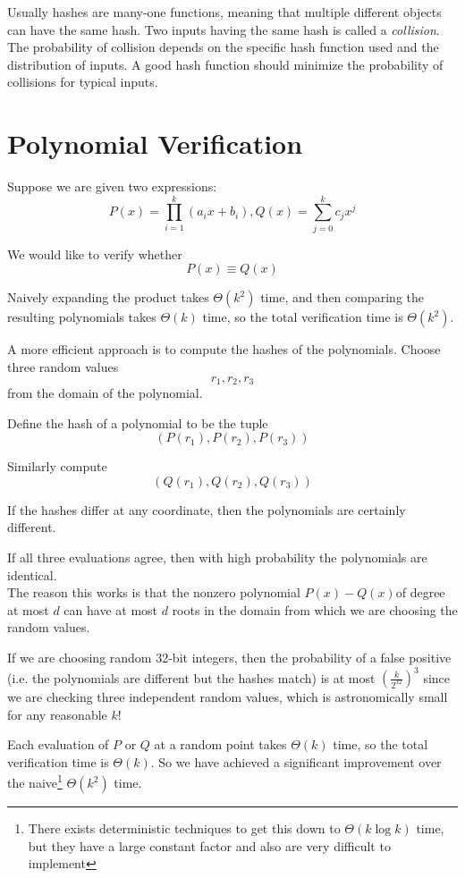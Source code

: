\documentclass[11pt,openany]{book}
\begin{document}
Usually hashes are many-one functions, meaning that multiple different objects can have the same hash. 
Two inputs having the same hash is called a \textit{collision}. The probability of collision depends on 
the specific hash function used and the distribution of inputs. A good hash function should minimize the 
probability of collisions for typical inputs.

\section{Polynomial Verification}

Suppose we are given two expressions:
\[
P(x)=\prod_{i=1}^k (a_i x+b_i), Q(x) = \sum_{j=0}^k c_j x^j
\]

We would like to verify whether
\[
P(x)\equiv Q(x)
\]

Naively expanding the product takes $\Theta(k^2)$ time, and then comparing the resulting 
polynomials takes $\Theta(k)$ time, so the total verification time is $\Theta(k^2)$.

A more efficient approach is to compute the hashes of the polynomials.
Choose three random values
\[
r_1,r_2,r_3
\]
from the domain of the polynomial.

Define the hash of a polynomial to be the tuple
\[
(P(r_1),P(r_2),P(r_3))
\]

Similarly compute
\[
(Q(r_1),Q(r_2),Q(r_3))
\]

If the hashes differ at any coordinate, then the polynomials are certainly different.

If all three evaluations agree, then with high probability the polynomials are identical.\\

The reason this works is that the nonzero polynomial $P(x)-Q(x)$of degree at most $d$ can have at most $d$ roots 
in the domain from which we are choosing the random values.

If we are choosing random 32-bit integers, then the probability of a false positive 
(i.e. the polynomials are different but the hashes match) 
is at most $\left(\frac{k}{2^{32}}\right)^3$ since we are checking three independent random values, 
which is astronomically small for any reasonable $k$!

Each evaluation of $P$ or $Q$ at a random point takes $\Theta(k)$ time, so 
the total verification time is $\Theta(k)$. So we have achieved a significant improvement over 
the naive\footnote{There exists deterministic techniques to get this down to $\Theta(k\log k)$ time, 
but they have a large constant factor and also are very difficult to implement} $\Theta(k^2)$ time.
\end{document}
